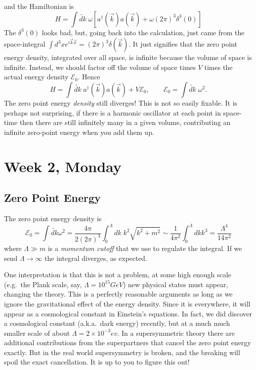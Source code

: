 \documentclass[12pt]{article}
\begin{document}
and the Hamiltonian is
\begin{equation}
  H = \int \widetilde{dk} \; \omega
  \left[
    a^\dagger(\vec{k}) a(\vec{k})
    + \omega (2\pi)^3 \delta^3(0)
  \right]
\end{equation}
The $\delta^3(0)$ looks bad, but, going back into the calculation,
just came from the space-integral $\int d^3x e^{i\vec{k}\vec{x}} =
(2\pi)^3 \delta(\vec{k})$. It just signifies that the zero point
energy density, integrated over all space, is infinite because the
volume of space is infinite. Instead, we should factor off the volume
of space times $V$ times the actual energy density
$\mathcal{E}_0$. Hence
\begin{equation}
  H = \int \widetilde{dk}  \;
  a^\dagger(\vec{k}) a(\vec{k})
  + V  \mathcal{E}_0
  ,\qquad
  \mathcal{E}_0 = \int \widetilde{dk}\; \omega^2.
\end{equation}
The zero point energy \emph{density} still diverges! This is not so
easily fixable. It is perhaps not surprising, if there is a harmonic
oscillator at each point in space-time then there are still infinitely
many in a given volume, contributing an infinite zero-point energy
when you add them up.



\section{Week 2, Monday}

\subsection{Zero Point Energy}

The zero point energy density is
\begin{equation}
  \mathcal{E}_0 = \int \widetilde{dk} \omega^2 =
  \frac{4\pi}{2(2\pi)^3} \int_0^\Lambda dk \; k^2 \sqrt{k^2+m^2}
  \sim
  \frac{1}{4\pi^2}\int_0^\Lambda dk k^3 = \frac{\Lambda^4}{14\pi^2}
\end{equation}
where $\Lambda \gg m$ is a \emph{momentum cutoff} that we use to
regulate the integral. If we send $\Lambda\to \infty$ the integral
diverges, as expected.

One interpretation is that this is not a problem, at some high enough
scale (e.g.\ the Plank scale, say, $\Lambda=10^{15} GeV$) new physical
states must appear, changing the theory. This is a perfectly
reasonable arguments as long as we ignore the gravitational effect of
the energy density. Since it is everywhere, it will appear as a
cosmological constant in Einstein's equations. In fact, we did
discover a cosmological constant (a.k.a.\ dark energy) recently, but
at a much much smaller scale of about $\Lambda = 2 \times
10^{-3}ev$. In a supersymmetric theory there are additional
contributions from the superpartners that cancel the zero point energy
exactly. But in the real world supersymmetry is broken, and the
breaking will spoil the exact cancellation. It is up to you to figure
this out!
\end{document}
